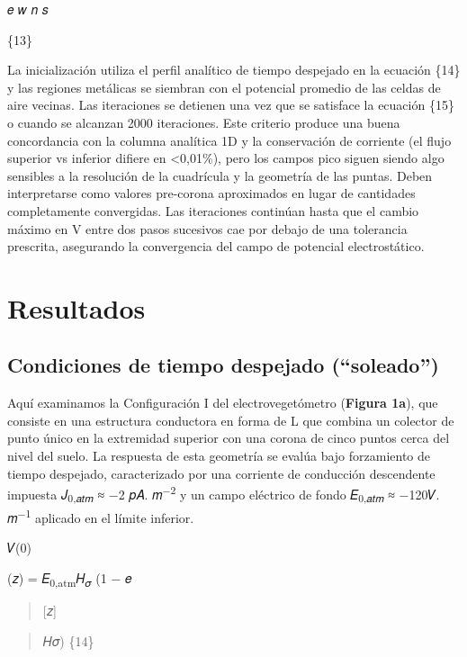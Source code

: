 \documentclass[
]{article}
\begin{document}
𝑒 𝑤 𝑛 𝑠

\{13\}

La inicialización utiliza el perfil analítico de tiempo despejado en la
ecuación \{14\} y las regiones metálicas se siembran con el potencial
promedio de las celdas de aire vecinas. Las iteraciones se detienen una
vez que se satisface la ecuación \{15\} o cuando se alcanzan 2000
iteraciones. Este criterio produce una buena concordancia con la columna
analítica 1D y la conservación de corriente (el flujo superior vs
inferior difiere en \textless0,01\%), pero los campos pico siguen siendo
algo sensibles a la resolución de la cuadrícula y la geometría de las
puntas. Deben interpretarse como valores pre-corona aproximados en lugar
de cantidades completamente convergidas. Las iteraciones continúan hasta
que el cambio máximo en V entre dos pasos sucesivos cae por debajo de
una tolerancia prescrita, asegurando la convergencia del campo de
potencial electrostático.

\section{Resultados}\label{resultados}

\subsection{Condiciones de tiempo despejado
(``soleado'')}\label{condiciones-de-tiempo-despejado-soleado}

Aquí examinamos la Configuración I del electrovegetómetro
(\textbf{Figura 1a}), que consiste en una estructura conductora en forma
de L que combina un colector de punto único en la extremidad superior
con una corona de cinco puntos cerca del nivel del suelo. La respuesta
de esta geometría se evalúa bajo forzamiento de tiempo despejado,
caracterizado por una corriente de conducción descendente impuesta
𝐽\textsubscript{0,𝑎𝑡𝑚} ≈ −2 𝑝𝐴. 𝑚\textsuperscript{−2} y un campo
eléctrico de fondo 𝐸\textsubscript{0,𝑎𝑡𝑚} ≈ −120𝑉. 𝑚\textsuperscript{−1}
aplicado en el límite inferior.

𝑉(0)

(𝑧) = 𝐸\textsubscript{0,atm}𝐻\textsubscript{𝜎} (1 − 𝑒

\begin{quote}
{[}𝑧{]}
\end{quote}

\begin{quote}
𝐻𝜎) \{14\}
\end{quote}
\end{document}
